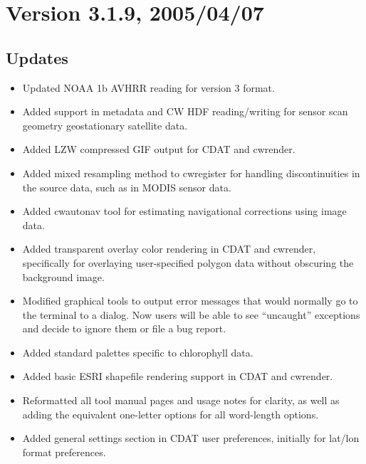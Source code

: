 

\section*{Version 3.1.9, 2005/04/07}

\subsection*{Updates}
\begin{itemize}

  \item Updated NOAA 1b AVHRR reading for version 3 format.

  \item Added support in metadata and CW HDF reading/writing for
  sensor scan geometry geostationary satellite data.

  \item Added LZW compressed GIF output for CDAT and cwrender.

  \item Added mixed resampling method to cwregister for handling
  discontinuities in the source data, such as in MODIS sensor data.

  \item Added cwautonav tool for estimating navigational corrections
  using image data.

  \item Added transparent overlay color rendering in CDAT and
  cwrender, specifically for overlaying user-specified polygon data
  without obscuring the background image.

  \item Modified graphical tools to output error messages that would
  normally go to the terminal to a dialog. Now users will be able to
  see ``uncaught'' exceptions and decide to ignore them or file a bug
  report.

  \item Added standard palettes specific to chlorophyll data.

  \item Added basic ESRI shapefile rendering support in CDAT and
  cwrender.

  \item Reformatted all tool manual pages and usage notes for clarity,
  as well as adding the equivalent one-letter options for all
  word-length options.

  \item Added general settings section in CDAT user preferences,
  initially for lat/lon format preferences.


\end{itemize}
